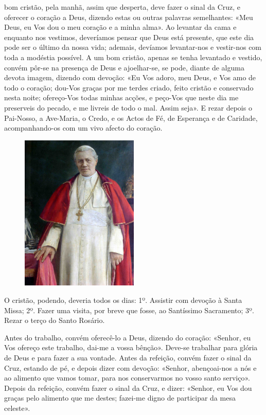 
 bom cristão, pela manhã, assim que desperta, deve fazer o sinal da Cruz, e oferecer o coração a Deus, dizendo estas ou outras palavras semelhantes: «Meu Deus, eu Vos dou o meu coração e a minha alma». Ao levantar da cama e enquanto nos vestimos, deveríamos pensar que Deus está presente, que este dia pode ser o último da nossa vida; ademais, devíamos levantar-nos e vestir-nos com toda a modéstia possível. A um bom cristão, apenas se tenha levantado e vestido, convém pôr-se na presença de Deus e ajoelhar-se, se pode, diante de alguma devota imagem, dizendo com devoção: «Eu Vos adoro, meu Deus, e Vos amo de todo o coração; dou-Vos graças por me terdes criado, feito cristão e conservado nesta noite; ofereço-Vos todas minhas acções, e peço-Vos que neste dia me preserveis do pecado, e me livreis de todo o mal. Assim seja». E rezar depois o Pai-Nosso, a Ave-Maria, o Credo, e os Actos de Fé, de Esperança e de Caridade, acompanhando-os com um vivo afecto do coração.\par
\begin{figure}
\includegraphics[width=0.5\textwidth]{media/piox}
\end{figure}
O cristão, podendo, deveria todos os dias: 1º. Assistir com devoção à Santa Missa; 2º. Fazer uma visita, por breve que fosse, ao Santíssimo Sacramento; 3º. Rezar o terço do Santo Rosário.\par
Antes do trabalho, convém oferecê-lo a Deus, dizendo do coração: «Senhor, eu Vos ofereço este trabalho, dai-me a vossa bênção». Deve-se trabalhar para glória de Deus e para fazer a sua vontade. Antes da refeição, convém fazer o sinal da Cruz, estando de pé, e depois dizer com devoção: «Senhor, abençoai-nos a nós e ao alimento que vamos tomar, para nos conservarmos no vosso santo serviço». Depois da refeição, convém fazer o sinal da Cruz, e dizer: «Senhor, eu Vos dou graças pelo alimento que me destes; fazei-me digno de participar da mesa celeste».\par
